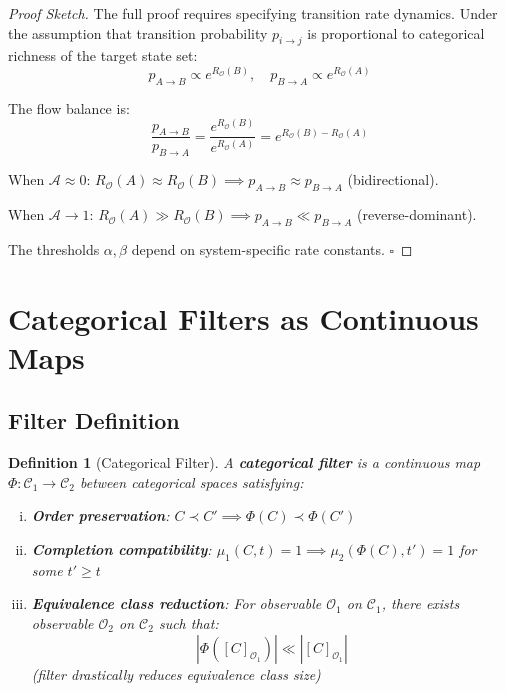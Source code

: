 \documentclass[12pt,a4paper]{article}
\newtheorem{definition}[theorem]{Definition}
\begin{document}
\begin{proof}[Proof Sketch]
The full proof requires specifying transition rate dynamics. Under the assumption that transition probability $p_{i \to j}$ is proportional to categorical richness of the target state set:
\begin{equation}
p_{A \to B} \propto e^{R_{\mathcal{O}}(B)}, \quad p_{B \to A} \propto e^{R_{\mathcal{O}}(A)}
\end{equation}

The flow balance is:
\begin{equation}
\frac{p_{A \to B}}{p_{B \to A}} = \frac{e^{R_{\mathcal{O}}(B)}}{e^{R_{\mathcal{O}}(A)}} = e^{R_{\mathcal{O}}(B) - R_{\mathcal{O}}(A)}
\end{equation}

When $\mathcal{A} \approx 0$: $R_{\mathcal{O}}(A) \approx R_{\mathcal{O}}(B) \implies p_{A \to B} \approx p_{B \to A}$ (bidirectional).

When $\mathcal{A} \to 1$: $R_{\mathcal{O}}(A) \gg R_{\mathcal{O}}(B) \implies p_{A \to B} \ll p_{B \to A}$ (reverse-dominant).

The thresholds $\alpha, \beta$ depend on system-specific rate constants. $\square$
\end{proof}

\section{Categorical Filters as Continuous Maps}

\subsection{Filter Definition}

\begin{definition}[Categorical Filter]
\label{def:categorical_filter}
A \textbf{categorical filter} is a continuous map $\Phi: \mathcal{C}_1 \to \mathcal{C}_2$ between categorical spaces satisfying:

\begin{enumerate}[(i)]
\item \textbf{Order preservation}: $C \prec C' \implies \Phi(C) \prec \Phi(C')$

\item \textbf{Completion compatibility}: $\mu_1(C, t) = 1 \implies \mu_2(\Phi(C), t') = 1$ for some $t' \geq t$

\item \textbf{Equivalence class reduction}: For observable $\mathcal{O}_1$ on $\mathcal{C}_1$, there exists observable $\mathcal{O}_2$ on $\mathcal{C}_2$ such that:
\begin{equation}
|\Phi([C]_{\mathcal{O}_1})| \ll |[C]_{\mathcal{O}_1}|
\end{equation}
(filter drastically reduces equivalence class size)
\end{enumerate}
\end{definition}
\end{document}
